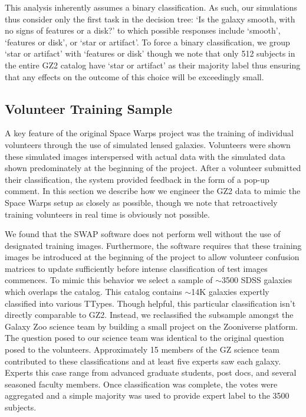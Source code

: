 \documentclass[twocolumn]{aastex6}
\begin{document}
This analysis inherently assumes a binary classification. As such, our simulations 
thus consider only the first task in the decision tree: `Is the galaxy smooth, with 
no signs of features or a disk?' to which possible responses include `smooth', 
`features or disk', or `star or artifact'. To force a binary classification, we group
`star or artifact' with `features or disk' though we note that only 512 subjects
in the entire GZ2 catalog have `star or artifact' as their majority label thus 
ensuring that any effects on the outcome of this choice will be exceedingly small. 



\subsection{Volunteer Training Sample}\label{sec: training sample}

A key feature of the original Space Warps project was the training of 
individual volunteers through the use of simulated lensed galaxies. Volunteers were 
shown these simulated images interspersed with actual data with the simulated data shown
predominately at the beginning of the project. After a volunteer submitted their 
classification, the system provided feedback in the form of a pop-up comment. 
In this section we describe how we engineer the GZ2 data to mimic the Space 
Warps setup as closely as possible, though we note that retroactively training 
volunteers in real time is obviously not possible. 

We found that the SWAP software does not perform well without the use of designated 
training images. Furthermore, the software requires that these training images
be introduced at the beginning of the project to allow volunteer confusion matrices
to update sufficiently before intense classification of test images commences. 
To mimic this behavior we select a sample of $\sim$3500 SDSS galaxies which 
overlaps the \cite{NairAbraham2010} catalog. This catalog contains $\sim$14K 
galaxies expertly classified into various TTypes. Though helpful, this particular
classification isn't directly comparable to GZ2.   Instead, we reclassified the subsample 
amongst the Galaxy Zoo science team by building a small project on the Zooniverse
platform. The question posed to our science team was identical to the original 
question posed to the volunteers. Approximately 15 members of the GZ science team
contributed to these classifications and at least five experts saw each galaxy. Experts 
this case range from advanced graduate students, post docs, and several 
seasoned faculty members. Once
classification was complete, the votes were aggregated and a simple majority was 
used to provide expert label  to the 3500 subjects. 
\end{document}
